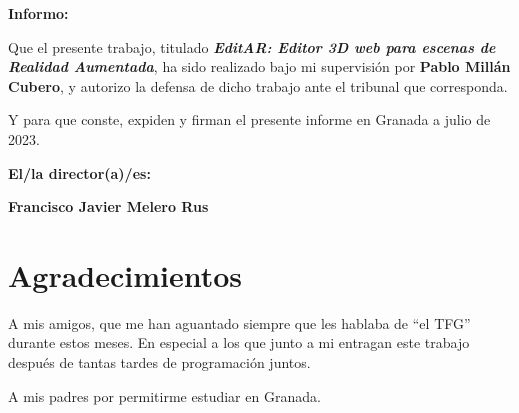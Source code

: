 \textbf{Informo:}

\vspace{0.5cm}

Que el presente trabajo, titulado \textit{\textbf{EditAR: Editor 3D web para escenas de Realidad Aumentada}},
ha sido realizado bajo mi supervisión por \textbf{Pablo Millán Cubero}, y autorizo la defensa de dicho trabajo ante el tribunal
que corresponda.

\vspace{0.5cm}

Y para que conste, expiden y firman el presente informe en Granada a julio de 2023.

\vspace{1cm}

\textbf{El/la director(a)/es: }

\vspace{5cm}

\noindent \textbf{Francisco Javier Melero Rus}

\chapter*{Agradecimientos}
A mis amigos, que me han aguantado siempre que les hablaba de ``el TFG'' durante estos meses. En especial a los que junto a mi entragan este trabajo después de tantas tardes de programación juntos.

A mis padres por permitirme estudiar en Granada.